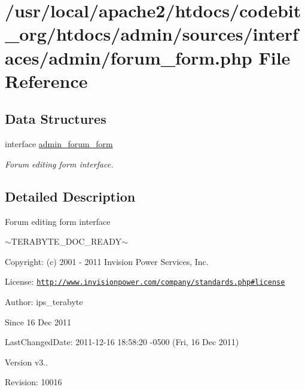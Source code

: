 \hypertarget{forum__form_8php}{\section{/usr/local/apache2/htdocs/codebit\-\_\-org/htdocs/admin/sources/interfaces/admin/forum\-\_\-form.php File Reference}
\label{forum__form_8php}
}
\subsection*{Data Structures}
\begin{DoxyCompactItemize}
\item 
interface \hyperlink{interfaceadmin__forum__form}{admin\-\_\-forum\-\_\-form}
\begin{DoxyCompactList}\small\item\em Forum editing form interface. \end{DoxyCompactList}\end{DoxyCompactItemize}


\subsection{Detailed Description}
\begin{DoxyVerb}  Forum editing form interface
\end{DoxyVerb}
 $\sim$\-T\-E\-R\-A\-B\-Y\-T\-E\-\_\-\-D\-O\-C\-\_\-\-R\-E\-A\-D\-Y$\sim$ \begin{DoxyParagraph}{Copyright\-:}
(c) 2001 -\/ 2011 Invision Power Services, Inc.
\end{DoxyParagraph}
\begin{DoxyParagraph}{License\-:}
\href{http://www.invisionpower.com/company/standards.php#license}{\tt http\-://www.\-invisionpower.\-com/company/standards.\-php\#license}
\end{DoxyParagraph}
\begin{DoxyParagraph}{Author\-:}
ips\-\_\-terabyte 
\end{DoxyParagraph}
\begin{DoxySince}{Since}
16 Dec 2011 
\end{DoxySince}
\begin{DoxyParagraph}{Last\-Changed\-Date\-:}
2011-\/12-\/16 18\-:58\-:20 -\/0500 (Fri, 16 Dec 2011) 
\end{DoxyParagraph}
\begin{DoxyVersion}{Version}
v3.. 
\end{DoxyVersion}
\begin{DoxyParagraph}{Revision\-:}
10016 
\end{DoxyParagraph}
